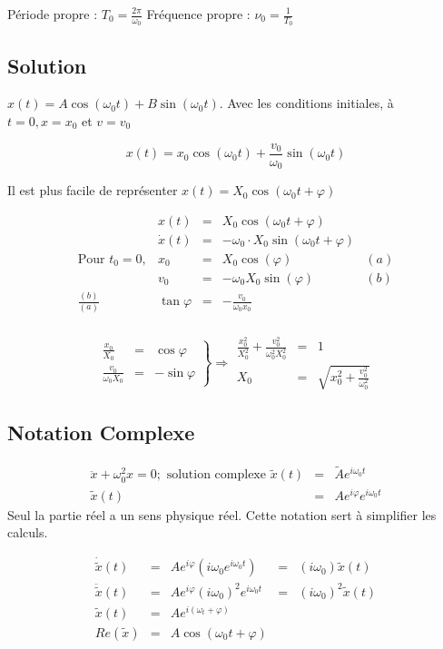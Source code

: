 Période propre : $T_0 = \frac{2\pi}{\omega_0}$
Fréquence propre : $\nu_0 = \frac{1}{T_0}$

\subsection{Solution} $x(t) = A\cos (\omega_0 t)+B\sin(\omega_0 t)$.
Avec les conditions initiales, à $t=0, x=x_0$ et $v=v_0$

\[x(t) = x_0\cos(\omega_0 t) + \frac{v_0}{\omega_0}\sin(\omega_0 t)\]

Il est plus facile de représenter $x(t) = X_0 \cos (\omega_0t + \varphi)$

\[\begin{array}{lrclr}
	&x(t) &=& X_0\cos(\omega_0 t + \varphi) \\
	&\dot{x}(t) &=& -\omega_0 \cdot X_0 \sin(\omega_0 t + \varphi) \\
	\text{Pour } t_0 = 0, & x_0 &=& X_0 \cos(\varphi) & (a) \\
	& v_0 &=& -\omega_0 X_0 \sin(\varphi) & (b) \\
	\frac{(b)}{(a)} & \tan \varphi &=& -\frac{v_0}{\omega_0x_0} \\
\end{array}\]

\[\left.\begin{array}{rcl}
	\frac{x_0}{X_0} &=& \cos \varphi \\
	\frac{v_0}{\omega_0 X_0} &=& -\sin \varphi 
\end{array}\right\} \Rightarrow \begin{array}{rcl}
		\frac{x_0^2}{X_0^2} + \frac{v_0^2}{\omega_0^2X_0^2} &=& 1 \\
		X_0 &=& \sqrt{x_0^2 + \frac{v_0^2}{\omega_0^2}} \end{array}\]

\subsection{Notation Complexe}

\[\begin{array}{rcl}
	\ddot{x}+\omega_0^2 x = 0; \text{ solution complexe } \tilde{x}(t) &=& \tilde{A}e^{i\omega_0t} \\
	\tilde{x}(t) &=& Ae^{i\varphi}e^{i\omega_0t} \end{array}\]
Seul la partie réel a un sens physique réel. Cette notation sert à simplifier les calculs.

\[\begin{array}{rclrcl}
	\dot{\tilde{x}}(t) &=& Ae^{i\varphi} (i\omega_0 e^{i\omega_0 t}) &=& (i\omega_0)\tilde{x}(t) \\
	\ddot{\tilde{x}}(t) &=& Ae^{i\varphi} (i\omega_0)^2 e^{i\omega_0 t} &=& (i\omega_0)^2 \tilde{x}(t) \\
	\tilde{x}(t) &=& Ae^{i(\omega_t + \varphi)}\\
	Re(\tilde{x}) &=& A\cos (\omega_0 t + \varphi)
\end{array}\]


